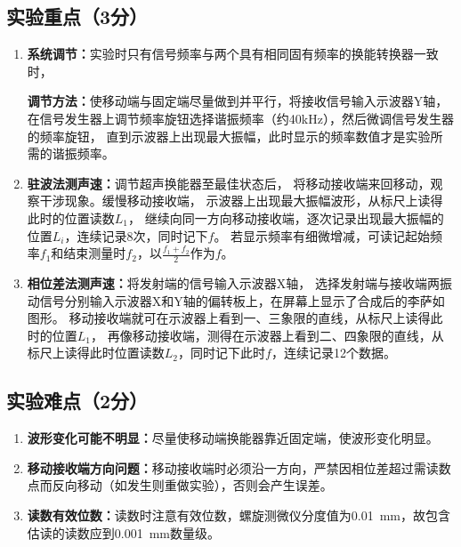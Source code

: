 \documentclass{../../templates/Report}
\begin{document}
\subsection{实验重点（3分）}
\begin{enumerate}
	\item \textbf{系统调节：}实验时只有信号频率与两个具有相同固有频率的换能转换器一致时，

	      \textbf{调节方法：}使移动端与固定端尽量做到并平行，将接收信号输入示波器Y轴，
	      在信号发生器上调节频率旋钮选择谐振频率（约40\si{\kilo\hertz}），然后微调信号发生器的频率旋钮，
	      直到示波器上出现最大振幅，此时显示的频率数值才是实验所需的谐振频率。

	\item \textbf{驻波法测声速：}调节超声换能器至最佳状态后，
	      将移动接收端来回移动，观察干涉现象。缓慢移动接收端，
	      示波器上出现最大振幅波形，从标尺上读得此时的位置读数$L_1$，
	      继续向同一方向移动接收端，逐次记录出现最大振幅的位置$L_i$，连续记录8次，同时记下$f$。
	      若显示频率有细微增减，可读记起始频率$f_1$和结束测量时$f_2$，以$\frac{f_1+f_2}{2}$作为$f$。

	\item \textbf{相位差法测声速：}将发射端的信号输入示波器X轴，
	      选择发射端与接收端两振动信号分别输入示波器X和Y轴的偏转板上，在屏幕上显示了合成后的李萨如图形。
	      移动接收端就可在示波器上看到一、三象限的直线，从标尺上读得此时的位置$L_1$，
	      再像移动接收端，测得在示波器上看到二、四象限的直线，从标尺上读得此时位置读数$L_2$，同时记下此时$f$，连续记录12个数据。
\end{enumerate}
\subsection{实验难点（2分）}
\begin{enumerate}
	\item \textbf{波形变化可能不明显：}尽量使移动端换能器靠近固定端，使波形变化明显。
	\item \textbf{移动接收端方向问题：}移动接收端时必须沿一方向，严禁因相位差超过需读数点而反向移动（如发生则重做实验），否则会产生误差。
	\item \textbf{读数有效位数：}读数时注意有效位数，螺旋测微仪分度值为\SI{0.01}{\mm}，故包含估读的读数应到\SI{0.001}{\mm}数量级。
\end{enumerate}
\end{document}
